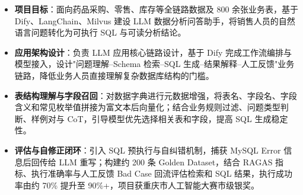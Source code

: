 \documentclass[10pt]{article}
\begin{document}
    \vspace{0.35em}
    \begin{itemize}
        \item \textbf{项目目标}：面向药品采购、零售、库存等全链路数据及 800 余张业务表，基于 Dify、LangChain、Milvus 建设 LLM 数据分析问答助手，将销售人员的自然语言问题转化为可执行 SQL 与可读分析结论。
        \item \textbf{应用架构设计}：负责 LLM 应用核心链路设计，基于 Dify 完成工作流编排与模型接入，设计"问题理解--Schema 检索--SQL 生成--结果解释--人工反馈"业务链路，降低业务人员直接理解复杂数据库结构的门槛。
        \item \textbf{表结构理解与字段召回}：对数据字典进行元数据增强，将表名、字段名、字段含义和常见枚举值拼接为富文本后向量化；结合业务规则过滤、问题类型判断、样例对与 CoT，引导模型优先选择相关表和字段，提高 SQL 生成稳定性。
        \item \textbf{评估与自修正闭环}：引入 SQL 预执行与自纠错机制，捕获 MySQL Error 信息后回传给 LLM 重写；构建约 200 条 Golden Dataset，结合 RAGAS 指标、执行准确率与人工反馈 Bad Case 回流评估检索和 SQL 结果，执行成功率由约 70\% 提升至 90\%+，项目获重庆市人工智能大赛市级银奖。
    \end{itemize}


\end{document}
